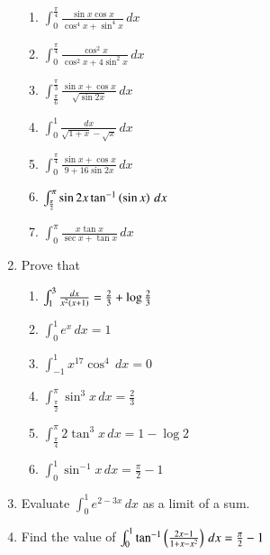 \begin{enumerate}[label=\arabic*.,ref=\thesubsection.\theenumi]
\begin{enumerate}[label = (\roman*)]
\item 
%
$
\int_{0}^{\frac{\pi}{4}}\frac{\sin x\cos x}{\cos^4 x + \sin^4 x}\,dx
$
\item 
%
$
\int_{0}^{\frac{\pi}{4}}\frac{\cos^2 x}{\cos^2 x + 4\sin^2 x}\,dx
$
\item 
%
$
\int_{\frac{\pi}{6}}^{\frac{\pi}{3}}\frac{\sin x+\cos x}{\sqrt{\sin 2x}}\,dx
$
\item 
%
$
\int_{0}^{1}\frac{dx}{\sqrt{1+x}-\sqrt{x}}\,dx
$
\item 
%
$
\int_{0}^{\frac{\pi}{4}}\frac{\sin x + \cos x}{9 + 16\sin 2 x}\,dx
$
\item $\int_{\frac{\pi}{2}}^{\pi}\sin 2x \tan^{-1}\left(\sin x\right)\, dx$
\item 
%
$
\int_{0}^{\pi}\frac{x\tan x}{\sec x + \tan x}\,dx
$
\end{enumerate}
\item Prove that
%
\begin{enumerate}[label = (\roman*)]
\item $\int_{1}^{3}\frac{dx}{x^2\left(x+1\right)} = \frac{2}{3}+\log \frac{2}{3}$
\item $\int_{0}^{1}e^x\,dx = 1$
\item $\int_{-1}^{1}x^{17}\cos^4\,dx = 0$
\item $\int_{\frac{\pi}{2}}^{\pi}\sin^ 3x \, dx = \frac{2}{3}$
\item $\int_{\frac{\pi}{4}}^{\pi}2\tan^ 3x \, dx = 1-\log 2$
\item $\int_{0}^{1}\sin^{-1}x\,dx = \frac{\pi}{2}-1$
\end{enumerate}
\item Evaluate  $\int_{0}^{1}e^{2-3x}\,dx$ as a limit of a sum.
\item Find the value of $\int_{0}^{1}\tan^{-1}\left(\frac{2x-1}{1+x-x^2}\right)\,dx = \frac{\pi}{2}-1$


\end{enumerate}
